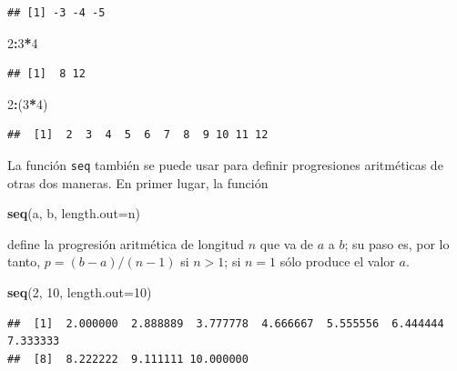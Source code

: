 \documentclass[]{book}
\newenvironment{Shaded}{\begin{snugshade}}{\end{snugshade}}
\newcommand{\DataTypeTok}[1]{\textcolor[rgb]{0.13,0.29,0.53}{#1}}
\newcommand{\DecValTok}[1]{\textcolor[rgb]{0.00,0.00,0.81}{#1}}
\newcommand{\KeywordTok}[1]{\textcolor[rgb]{0.13,0.29,0.53}{\textbf{#1}}}
\newcommand{\NormalTok}[1]{#1}
\newcommand{\OperatorTok}[1]{\textcolor[rgb]{0.81,0.36,0.00}{\textbf{#1}}}
\theoremstyle{definition}
\theoremstyle{definition}
\theoremstyle{definition}
\theoremstyle{remark}
\begin{document}
\begin{verbatim}
## [1] -3 -4 -5
\end{verbatim}

\begin{Shaded}
\begin{Highlighting}[]
\DecValTok{2}\OperatorTok{:}\DecValTok{3}\OperatorTok{*}\DecValTok{4}
\end{Highlighting}
\end{Shaded}

\begin{verbatim}
## [1]  8 12
\end{verbatim}

\begin{Shaded}
\begin{Highlighting}[]
\DecValTok{2}\OperatorTok{:}\NormalTok{(}\DecValTok{3}\OperatorTok{*}\DecValTok{4}\NormalTok{)}
\end{Highlighting}
\end{Shaded}

\begin{verbatim}
##  [1]  2  3  4  5  6  7  8  9 10 11 12
\end{verbatim}

La función \texttt{seq} también se puede usar para definir progresiones aritméticas de otras dos maneras. En primer lugar, la función

\begin{Shaded}
\begin{Highlighting}[]
\KeywordTok{seq}\NormalTok{(a, b, }\DataTypeTok{length.out=}\NormalTok{n)}
\end{Highlighting}
\end{Shaded}

define la progresión aritmética de longitud \(n\) que va de \(a\) a \(b\); su paso es, por lo tanto, \(p=(b-a)/(n-1)\) si \(n>1\); si \(n=1\) sólo produce el valor \(a\).

\begin{Shaded}
\begin{Highlighting}[]
\KeywordTok{seq}\NormalTok{(}\DecValTok{2}\NormalTok{, }\DecValTok{10}\NormalTok{, }\DataTypeTok{length.out=}\DecValTok{10}\NormalTok{)}
\end{Highlighting}
\end{Shaded}

\begin{verbatim}
##  [1]  2.000000  2.888889  3.777778  4.666667  5.555556  6.444444  7.333333
##  [8]  8.222222  9.111111 10.000000
\end{verbatim}
\end{document}
